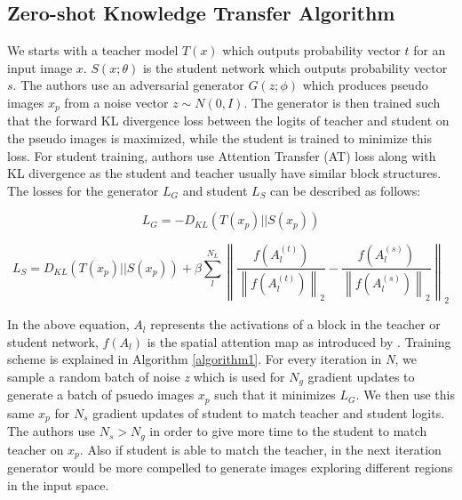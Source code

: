 \documentclass{article}
\begin{document}
\subsection{Zero-shot Knowledge Transfer Algorithm}
We starts with a teacher model $T(x)$ which outputs probability vector $t$ for an input image $x$. $S(x;\theta)$ is the student network which outputs probability vector $s$. The authors use an adversarial generator $G(z;\phi)$ which produces pseudo images $x_p$ from a noise vector $z\sim N(0,I)$. The generator is then trained such that the forward KL divergence loss between the logits of teacher and student on the pseudo images is maximized, while the student is trained to minimize this loss. For student training, authors use Attention Transfer (AT) loss \cite{zagoruyko2016paying} along with KL divergence as the student and teacher usually have similar block structures. The losses for the generator $L_G$ and student $L_S$ can be described as follows:

\begin{equation}
    L_G=-D_{KL}(T(x_p) || S(x_p))
\end{equation}

\begin{equation}
    L_S=D_{KL}(T(x_p) || S(x_p))+\beta \sum^{N_L}_{l}{\left\|\frac{f(A_l^{(t)})}{\left\|f(A_l^{(t)})\right\|_2}-\frac{f(A_l^{(s)})}{\left\|f(A_l^{(s)})\right\|_2} \right\|}_2
\end{equation}

In the above equation, $A_l$ represents the activations of a block in the teacher or student network, $f(A_l)$ is the spatial attention map as introduced by \cite{zagoruyko2016paying}. Training scheme is explained in Algorithm \ref{algorithm1}. For every iteration in \textit{N}, we sample a random batch of noise \textit{z} which is used for $N_g$ gradient updates to generate a batch of psuedo images $x_p$ such that it minimizes $L_G$. We then use this same $x_p$ for $N_s$ gradient updates of student to match teacher and student logits. The authors use $N_s > N_g$ in order to give more time to the student to match teacher on $x_p$. Also if student is able to match the teacher, in the next iteration generator would be more compelled to generate images exploring different regions in the input space.
\end{document}

